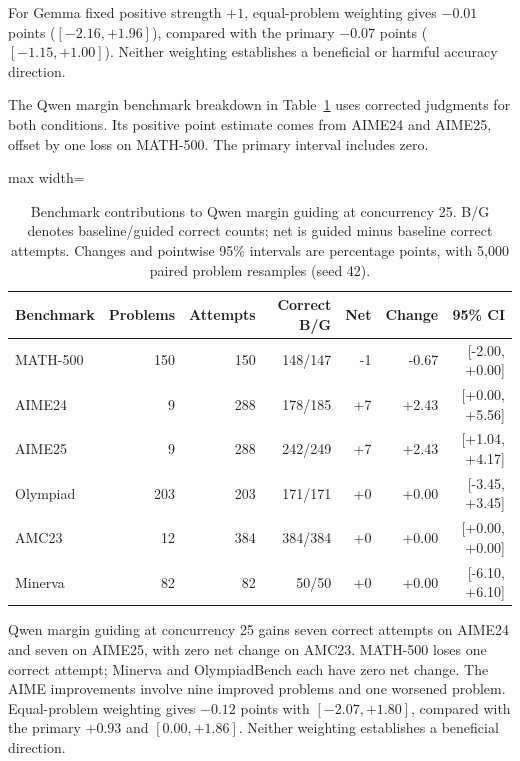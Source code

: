 \documentclass[12pt,a4paper,twoside,openright]{book}
\begin{document}
For Gemma fixed positive strength $+1$, equal-problem weighting gives
$-0.01$ points ($[-2.16,+1.96]$), compared with the primary
$-0.07$ points ($[-1.15,+1.00]$). Neither weighting establishes a
beneficial or harmful accuracy direction.

The Qwen margin benchmark breakdown in Table~\ref{tab:res-qwen-margin-breakdown}
uses corrected judgments for both conditions. Its positive point estimate
comes from AIME24 and AIME25, offset by one loss on MATH-500. The
primary interval includes zero.

\begin{table}[!ht]
\centering\small
\caption{Benchmark contributions to Qwen margin guiding at concurrency 25. B/G denotes baseline/guided correct counts; net is guided minus baseline correct attempts. Changes and pointwise 95\% intervals are percentage points, with 5,000 paired problem resamples (seed 42).}
\label{tab:res-qwen-margin-breakdown}
\begin{adjustbox}{max width=\linewidth}%
\begin{tabular}{lrrrrrr}
\toprule
Benchmark & Problems & Attempts & Correct B/G & Net & Change & 95\% CI \\
\midrule
MATH-500 & 150 & 150 & 148/147 & -1 & -0.67 & [-2.00, +0.00] \\
AIME24 & 9 & 288 & 178/185 & +7 & +2.43 & [+0.00, +5.56] \\
AIME25 & 9 & 288 & 242/249 & +7 & +2.43 & [+1.04, +4.17] \\
Olympiad & 203 & 203 & 171/171 & +0 & +0.00 & [-3.45, +3.45] \\
AMC23 & 12 & 384 & 384/384 & +0 & +0.00 & [+0.00, +0.00] \\
Minerva & 82 & 82 & 50/50 & +0 & +0.00 & [-6.10, +6.10] \\
\bottomrule
\end{tabular}
\end{adjustbox}
\end{table}


Qwen margin guiding at concurrency 25 gains seven correct attempts on
AIME24 and seven on AIME25, with zero net change on AMC23. MATH-500
loses one correct attempt; Minerva and OlympiadBench each have zero net
change. The AIME improvements involve nine improved problems and one
worsened problem. Equal-problem weighting gives $-0.12$ points with
$[-2.07,+1.80]$, compared with the primary $+0.93$ and $[0.00,+1.86]$.
Neither weighting establishes a beneficial direction.
\end{document}
